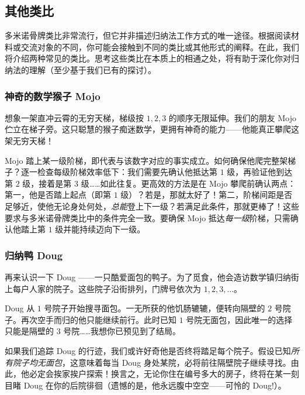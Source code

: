 \subsection{其他类比}

多米诺骨牌类比非常流行，但它并非描述归纳法工作方式的唯一途径。根据阅读材料或交流对象的不同，你可能会接触到不同的类比或其他形式的阐释。在此，我们将介绍两种常见的类比。思考这些类比在本质上的相通之处，将有助于深化你对归纳法的理解（至少基于我们已有的探讨）。

\subsubsection*{神奇的数学猴子 Mojo}

想象一架直冲云霄的无穷天梯，梯级按 $1, 2, 3$ 的顺序无限延伸。我们的朋友 Mojo 伫立在梯子旁。这只聪慧的猴子痴迷数学，更拥有神奇的能力——他能真正攀爬这架无穷天梯！

Mojo 踏上某一级阶梯，即代表与该数字对应的事实成立。如何确保他爬完整架梯子？逐一检查每级阶梯效率低下：我们需要先确认他抵达第 $1$ 级，再验证他到达第 $2$ 级，接着是第 $3$ 级……如此往复。更高效的方法是在 Mojo 攀爬前确认两点：第一，他是否踏上起点（即第 $1$ 级）？若是，那就太好了！第二，阶梯间距是否足够近，使他无论身处何处，\emph{总能}登上下一级？若满足此条件，那就更棒了！这些要求与多米诺骨牌类比中的条件完全一致。要确保 Mojo 抵达\emph{每一级}阶梯，只需确认他踏上第 $1$ 级并能持续迈向下一级。

\subsubsection*{归纳鸭 Doug}

再来认识一下 Doug ——一只酷爱面包的鸭子。为了觅食，他会造访数学镇归纳街上每户人家的院子。这些院子沿街排列，门牌号依次为 $1, 2, 3, \dots$。

Doug 从 $1$ 号院子开始搜寻面包。一无所获的他饥肠辘辘，便转向隔壁的 $2$ 号院子。再次空手而归的他只能继续前行。此时已知 $1$ 号院无面包，因此唯一的选择只能是隔壁的 $3$ 号院……我想你已预见到了结局。

如果我们追踪 Doug 的行迹，我们或许好奇他是否终将踏足每个院子。假设已知\emph{所有院子均无面包}，这意味着每当 Doug 身处某院，必将前往隔壁院子继续寻找。由此，他必定会挨家挨户探索！换言之，无论你住在编号多大的房子，终将在某一刻目睹 Doug 在你的后院徘徊（遗憾的是，他永远腹中空空——可怜的 Doug!）。
